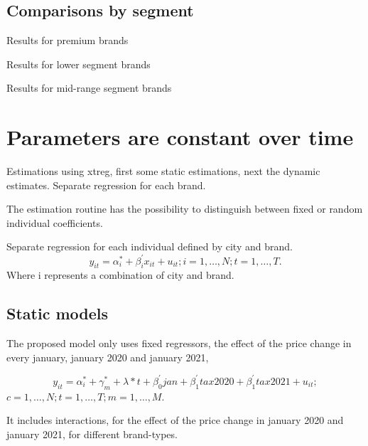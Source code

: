 \documentclass[]{article}
\begin{document}
\subsection{Comparisons by segment}
Results for premium brands



Results for lower segment brands



Results for mid-range segment brands





\section{Parameters are constant over time }
Estimations using xtreg, first some static estimations, next the dynamic estimates.
Separate regression for each brand.

The estimation routine has the possibility to distinguish between fixed or random individual coefficients.

Separate regression for each individual defined by city and brand.
\begin{equation*}
	y_{it} = \alpha_{i}^{*} + \beta_{i}^{'}x_{it} + u_{it}; i = 1,\ldots,N; t=1,\ldots,T.
\end{equation*}
Where i represents a combination of city and brand.


\subsection{Static models}
The proposed model only uses fixed regressors, the effect of the price change in every january, january 2020 and january 2021,

\begin{equation*} 
	y_{it}  = \alpha_{i}^{*} + \gamma_{m}^{*} + \lambda*t + \beta_{0}^{'}jan + \beta_{1}^{'}tax2020 + \beta_{1}^{'}tax2021 + u_{it}
	;   \tag{4.1}
\end{equation*}
$c  = 1,\ldots,N;  t=1,\ldots,T; m=1,\ldots,M. $

It includes interactions, for the effect of the price change in january 2020 and january 2021, for different brand-types.
\end{document}
